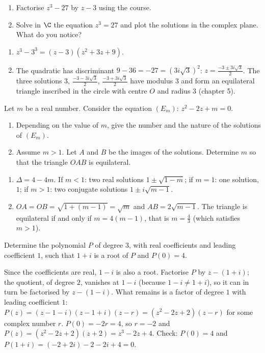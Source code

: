 \begin{exercise}[Factorising $z^3-27$]
\begin{enumerate}
\item Factorise $z^3-27$ by $z-3$ using the course.
\item Solve in $\C$ the equation $z^3=27$ and plot the solutions in the complex plane. What do you notice?
\end{enumerate}
\end{exercise}
\begin{solution}
\begin{enumerate}
\item $z^3-3^3=(z-3)\left(z^2+3z+9\right)$.
\item The quadratic has discriminant $9-36=-27=\left(3i\sqrt3\right)^2$: $z=\frac{-3\pm3i\sqrt3}2$. The three solutions $3$, $\frac{-3-3i\sqrt3}2$, $\frac{-3+3i\sqrt3}2$ have modulus $3$ and form an equilateral triangle inscribed in the circle with centre $O$ and radius $3$ (chapter 5).
\end{enumerate}
\end{solution}

\begin{exercise}[A parameter]
Let $m$ be a real number. Consider the equation $(E_m)$: $z^2-2z+m=0$.
\begin{enumerate}
\item Depending on the value of $m$, give the number and the nature of the solutions of $(E_m)$.
\item Assume $m>1$. Let $A$ and $B$ be the images of the solutions. Determine $m$ so that the triangle $OAB$ is equilateral.
\end{enumerate}
\end{exercise}
\begin{solution}
\begin{enumerate}
\item $\Delta=4-4m$. If $m<1$: two real solutions $1\pm\sqrt{1-m}$; if $m=1$: one solution, $1$; if $m>1$: two conjugate solutions $1\pm i\sqrt{m-1}$.
\item $OA=OB=\sqrt{1+(m-1)}=\sqrt m$ and $AB=2\sqrt{m-1}$. The triangle is equilateral if and only if $m=4(m-1)$, that is $m=\frac43$ (which satisfies $m>1$).
\end{enumerate}
\end{solution}

\begin{exercise}
Determine the polynomial $P$ of degree $3$, with real coefficients and leading coefficient $1$, such that $1+i$ is a root of $P$ and $P(0)=4$.
\end{exercise}
\begin{solution}
Since the coefficients are real, $1-i$ is also a root. Factorise $P$ by $z-(1+i)$; the quotient, of degree $2$, vanishes at $1-i$ (because $1-i\neq1+i$), so it can in turn be factorised by $z-(1-i)$. What remains is a factor of degree $1$ with leading coefficient $1$: $P(z)=(z-1-i)(z-1+i)(z-r)=\left(z^2-2z+2\right)(z-r)$ for some complex number $r$. $P(0)=-2r=4$, so $r=-2$ and $P(z)=\left(z^2-2z+2\right)(z+2)=z^3-2z+4$. Check: $P(0)=4$ and $P(1+i)=(-2+2i)-2-2i+4=0$.
\end{solution}

